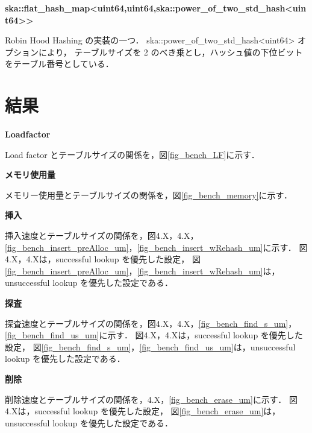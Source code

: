 %
{\bf ska::flat\_hash\_map<uint64,uint64,ska::power\_of\_two\_std\_hash<uint64>>}

Robin Hood Hashing の実装の一つ．
ska::power\_of\_two\_std\_hash<uint64> オプションにより，
テーブルサイズを 2 のべき乗とし，ハッシュ値の下位ビットをテーブル番号としている．

\leavevmode \newline


\section{結果}

%
{\bf Loadfactor}

Load factor とテーブルサイズの関係を，図\ref{fig_bench_LF}に示す．
\leavevmode \newline

%
{\bf メモリ使用量}

メモリー使用量とテーブルサイズの関係を，図\ref{fig_bench_memory}に示す．
\leavevmode \newline

%
{\bf 挿入}

挿入速度とテーブルサイズの関係を，図4.X，4.X，\ref{fig_bench_insert_preAlloc_um}，\ref{fig_bench_insert_wRehash_um}に示す．
図4.X，4.Xは，successful lookup を優先した設定，
図\ref{fig_bench_insert_preAlloc_um}，\ref{fig_bench_insert_wRehash_um}は，unsuccessful lookup を優先した設定である．
\leavevmode \newline

%
{\bf 探査}

探査速度とテーブルサイズの関係を，図4.X，4.X，\ref{fig_bench_find_s_um}，\ref{fig_bench_find_us_um}に示す．
図4.X，4.Xは，successful lookup を優先した設定，
図\ref{fig_bench_find_s_um}，\ref{fig_bench_find_us_um}は，unsuccessful lookup を優先した設定である．
\leavevmode \newline

%
{\bf 削除}

削除速度とテーブルサイズの関係を，4.X，\ref{fig_bench_erase_um}に示す．
図4.Xは，successful lookup を優先した設定，
図\ref{fig_bench_erase_um}は，unsuccessful lookup を優先した設定である．
\leavevmode \newline


